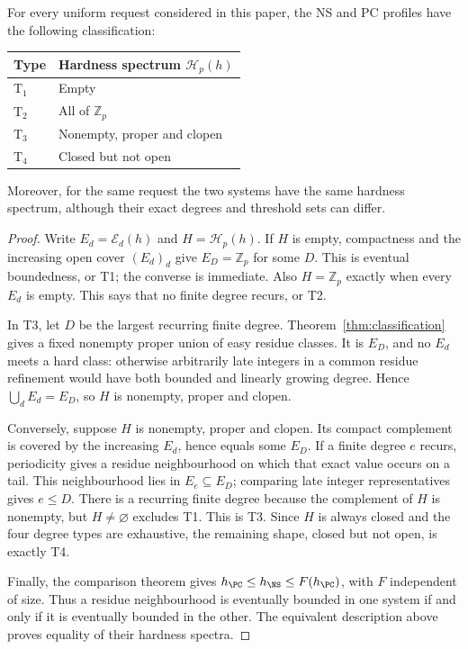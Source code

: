 \begin{samepage}
\begin{corollary}
\label{cor:topological-spectrum}
For every uniform request considered in this paper, the NS and PC
profiles have the following classification:
\begin{center}
\begin{tabular}{@{}ll@{}}
\toprule
Type & Hardness spectrum $\mathcal H_p(h)$\\
\midrule
$\mathrm T_1$ & Empty\\
$\mathrm T_2$ & All of $\mathbb Z_p$\\
$\mathrm T_3$ & Nonempty, proper and clopen\\
$\mathrm T_4$ & Closed but not open\\
\bottomrule
\end{tabular}
\end{center}
Moreover, for the same request the two systems have the same hardness
spectrum, although their exact degrees and threshold sets can differ.
\end{corollary}
\end{samepage}
\begin{proof}
Write $E_d=\mathcal E_d(h)$ and $H=\mathcal H_p(h)$. If $H$ is empty,
compactness and the increasing open cover $(E_d)_d$ give
$E_D=\mathbb Z_p$ for some $D$. This is eventual boundedness, or T1;
the converse is immediate. Also $H=\mathbb Z_p$ exactly when every
$E_d$ is empty. This says that no finite degree recurs, or T2.

In T3, let $D$ be the largest recurring finite degree.
Theorem~\ref{thm:classification} gives a fixed nonempty proper union
of easy residue classes. It is $E_D$, and no $E_d$ meets a hard class:
otherwise arbitrarily late integers in a common residue refinement
would have both bounded and linearly growing degree. Hence
$\bigcup_dE_d=E_D$, so $H$ is nonempty, proper and clopen.

Conversely, suppose $H$ is nonempty, proper and clopen. Its compact
complement is covered by the increasing $E_d$, hence equals some $E_D$.
If a finite degree $e$ recurs, periodicity gives a residue neighbourhood
on which that exact value occurs on a tail. This neighbourhood lies
in $E_e\subseteq E_D$; comparing late integer representatives gives
$e\le D$. There is a recurring finite degree because the complement
of $H$ is nonempty, but $H\ne\varnothing$ excludes T1. This is T3.
Since $H$ is always closed and the four degree types are exhaustive,
the remaining shape, closed but not open, is exactly T4.

Finally, the comparison theorem gives
$h_{\PC}\le h_{\NS}\le F(h_{\PC})$, with $F$ independent of size.
Thus a residue neighbourhood is eventually bounded in one system if
and only if it is eventually bounded in the other. The equivalent
description above proves equality of their hardness spectra.
\end{proof}

